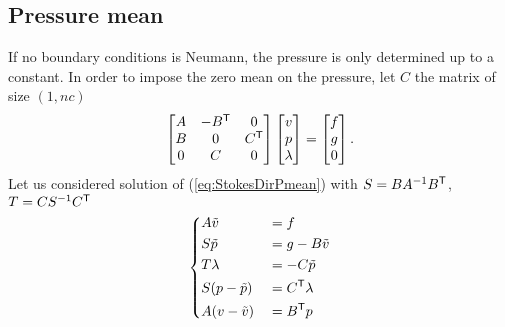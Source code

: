 \subsection{Pressure mean}\label{subsec:}
%
If no boundary conditions is Neumann, the pressure is only determined up to a constant. In order to impose the zero mean on the pressure, let $C$ the matrix of size $(1,nc)$
%
\begin{equation}\label{eq:StokesDirPmean}
\begin{bmatrix}
A  & -{B}^{\mathsf{T}}& 0\\
B & 0 & {C}^{\mathsf{T}}\\
0 & C & 0
\end{bmatrix}
\begin{bmatrix}
v\\
p\\
\lambda
\end{bmatrix}
=
\begin{bmatrix}
f\\
g\\
0
\end{bmatrix}.
\end{equation}
%
Let us considered solution of (\ref{eq:StokesDirPmean}) with $S=BA^{-1}{B}^{\mathsf{T}}$, $T=CS^{-1}{C}^{\mathsf{T}}$
%
\begin{equation}\label{eq:}
%
\left\{
\begin{aligned}
&A \tilde v &&= f\\
&S \tilde p &&= g-B\tilde v\\
&T \lambda &&= -C\tilde p\\
&S (p-\tilde p) &&= \transpose{C} \lambda\\
&A(v-\tilde v) &&=  \transpose{B} p
\end{aligned}
\right.
%
\end{equation}
%
%
